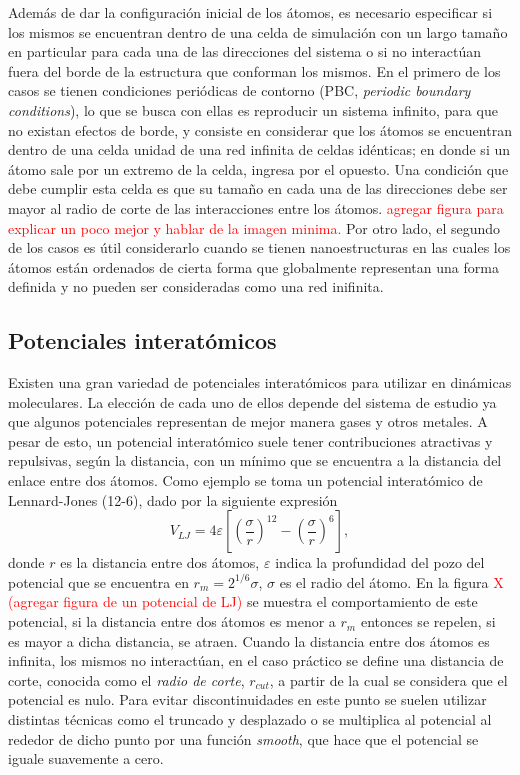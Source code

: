Además de dar la configuración inicial de los átomos, es necesario especificar si
los mismos se encuentran dentro de una celda de simulación con un largo tamaño en
particular para cada una de las direcciones del sistema o si no interactúan fuera
del borde de la estructura que conforman los mismos. En el primero de los casos
se tienen condiciones periódicas de contorno (PBC, \textit{periodic boundary 
conditions}), lo que se busca con ellas es reproducir un sistema infinito, para
que no existan efectos de borde, y consiste en considerar que los átomos se 
encuentran dentro de una celda unidad de una red infinita de celdas idénticas; en
donde si un átomo sale por un extremo de la celda, ingresa por el opuesto. Una
condición que debe cumplir esta celda es que su tamaño en cada una de las 
direcciones debe ser mayor al radio de corte de las interacciones entre los átomos. 
\textcolor{red}{agregar figura para explicar un poco mejor y hablar de la imagen
minima.} Por otro lado, el segundo de los casos es útil considerarlo cuando se 
tienen nanoestructuras en las cuales los átomos están ordenados de cierta forma 
que globalmente representan una forma definida y no pueden ser consideradas como
una red inifinita.

\subsection{Potenciales interatómicos}

Existen una gran variedad de potenciales interatómicos para utilizar en dinámicas
moleculares. La elección de cada uno de ellos depende del sistema de estudio ya
que algunos potenciales representan de mejor manera gases y otros metales. A pesar
de esto, un potencial interatómico suele tener contribuciones atractivas y
repulsivas, según la distancia, con un mínimo que se encuentra a la distancia del
enlace entre dos átomos. Como ejemplo se toma un potencial interatómico de 
Lennard-Jones (12-6), dado por la siguiente expresión
$$
V_{LJ} = 4\varepsilon \left[ \left( \frac{\sigma}{r} \right)^{12} - 
                             \left( \frac{\sigma}{r} \right)^{6} \right],
$$
donde $r$ es la distancia entre dos átomos, $\varepsilon$ indica la profundidad 
del pozo del potencial que se encuentra en $r_m = 2^{1/6} \sigma$, $\sigma$ es el
radio del átomo. En la figura \textcolor{red}{X (agregar figura de un potencial 
de LJ)} se muestra el comportamiento de este potencial, si la distancia entre dos
átomos es menor a $r_m$ entonces se repelen, si es mayor a dicha distancia, se 
atraen. Cuando la distancia entre dos átomos es infinita, los mismos no 
interactúan, en el caso práctico se define una distancia de corte, conocida como
el \textit{radio de corte}, $r_{cut}$, a partir de la cual se considera que el 
potencial es nulo. Para evitar discontinuidades en este punto se suelen utilizar 
distintas técnicas como el truncado y desplazado o se multiplica al potencial 
al rededor de dicho punto por una función \textit{smooth}, que hace que el 
potencial se iguale suavemente a cero.

